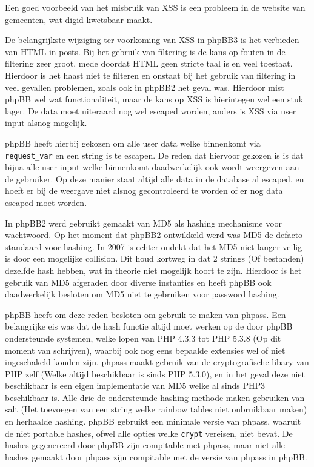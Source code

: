 Een goed voorbeeld van het misbruik van XSS is een probleem in de website van gemeenten, wat digid kwetsbaar maakt\cite{bib.digid}.

De belangrijkste wijziging ter voorkoming van XSS in phpBB3 is het verbieden van HTML in posts. Bij het gebruik van filtering is de kans op fouten in de filtering zeer groot, mede doordat HTML geen stricte taal is en veel toestaat. Hierdoor is het haast niet te filteren en onstaat bij het gebruik van filtering in veel gevallen problemen, zoals ook in phpBB2 het geval was. Hierdoor mist phpBB wel wat functionaliteit, maar de kans op XSS is hierintegen wel een stuk lager. De data moet uiteraard nog wel escaped worden, anders is XSS via user input alsnog mogelijk.

phpBB heeft hierbij gekozen om alle user data welke binnenkomt via \texttt{request\_var} en een string is te escapen. De reden dat hiervoor gekozen is is dat bijna alle user input welke binnenkomt daadwerkelijk ook wordt weergeven aan de gebruiker. Op deze manier staat altijd alle data in de database al escaped, en hoeft er bij de weergave niet alsnog gecontroleerd te worden of er nog data escaped moet worden.

In phpBB2 werd gebruikt gemaakt van MD5 als hashing mechanisme voor wachtwoord. Op het moment dat phpBB2 ontwikkeld werd was MD5 de defacto standaard voor hashing. In 2007 is echter ondekt dat het MD5 niet langer veilig is door een mogelijke collision\cite{bib.md5.col}. Dit houd kortweg in dat 2 strings (Of bestanden) dezelfde hash hebben, wat in theorie niet mogelijk hoort te zijn. Hierdoor is het gebruik van MD5 afgeraden door diverse instanties en heeft phpBB ook daadwerkelijk besloten om MD5 niet te gebruiken voor password hashing.

phpBB heeft om deze reden besloten om gebruik te maken van phpass\cite{bib.phpass}. Een belangrijke eis was dat de hash functie altijd moet werken op de door phpBB ondersteunde systemen, welke lopen van PHP 4.3.3 tot PHP 5.3.8 (Op dit moment van schrijven), waarbij ook nog eens bepaalde extensies wel of niet ingeschakeld konden zijn. phpass\cite{bib.phpass.art}  maakt gebruik van de cryptografische libary van PHP zelf (Welke altijd beschikbaar is sinds PHP 5.3.0), en in het geval deze niet beschikbaar is een eigen implementatie van MD5 welke al sinds PHP3 beschikbaar is. Alle drie de ondersteunde hashing methode maken gebruiken van salt (Het toevoegen van een string welke rainbow tables niet onbruikbaar maken) en herhaalde hashing. phpBB gebruikt een minimale versie van phpass, waaruit de niet portable hashes, ofwel alle opties welke \texttt{crypt} vereisen, niet bevat. De hashes gegenereerd door phpBB zijn compitable met phpass, maar niet alle hashes gemaakt door phpass zijn compitable met de versie van phpass in phpBB.

